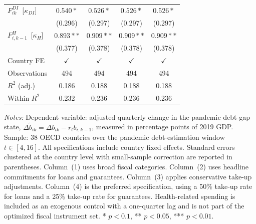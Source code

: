 \begin{table}[H]
\begin{tabular}{@{} l c c c c @{}}
$F^{DI}_{ik}$ \,[$\kappa_{DI}$] & $0.540*$ & $0.526*$ & $0.526*$ & $0.526*$ \\
 & (0.296) & (0.297) & (0.297) & (0.297) \\[4pt]
$F^{H}_{i,k-1}$ \,[$\kappa_H$] & $0.893**$ & $0.909**$ & $0.909**$ & $0.909**$ \\
 & (0.377) & (0.378) & (0.378) & (0.378) \\[4pt]
\midrule
Country FE & $\checkmark$ & $\checkmark$ & $\checkmark$ & $\checkmark$ \\
Observations & 494 & 494 & 494 & 494 \\
$R^2$ (adj.) & 0.186 & 0.188 & 0.188 & 0.188 \\
Within $R^2$ & 0.232 & 0.236 & 0.236 & 0.236 \\
\bottomrule
\end{tabular}
\vspace{4pt}
\parbox{\textwidth}{\scriptsize\textit{Notes:} Dependent variable: adjusted quarterly change in the pandemic debt-gap state, $\Delta \tilde b_{ik}=\Delta b_{ik}-r_t b_{i,k-1}$, measured in percentage points of 2019 GDP. Sample: 38 OECD countries over the pandemic debt-estimation window $t \in [4,16]$. All specifications include country fixed effects. Standard errors clustered at the country level with small-sample correction are reported in parentheses. Column~(1) uses broad fiscal categories. Column~(2) uses headline commitments for loans and guarantees. Column~(3) applies conservative take-up adjustments. Column~(4) is the preferred specification, using a 50\% take-up rate for loans and a 25\% take-up rate for guarantees. Health-related spending is included as an exogenous control with a one-quarter lag and is not part of the optimized fiscal instrument set. * $p<0.1$, ** $p<0.05$, *** $p<0.01$.}
\end{table}
